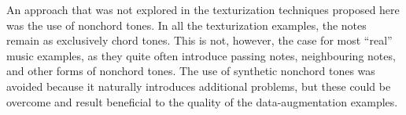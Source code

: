 
An approach that was not explored in the texturization
techniques proposed here was the use of nonchord tones. In
all the texturization examples, the notes remain as
exclusively chord tones. This is not, however, the case for
most ``real'' music examples, as they quite often introduce
passing notes, neighbouring notes, and other forms of
nonchord tones. The use of synthetic nonchord tones was
avoided because it naturally introduces additional problems,
but these could be overcome and result beneficial to the
quality of the data-augmentation examples.
